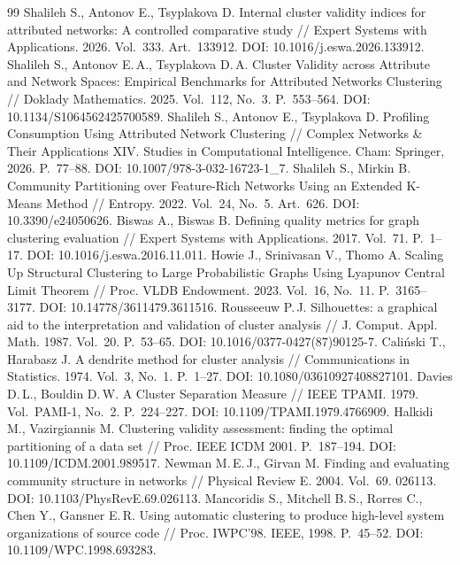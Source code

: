 \documentclass[11pt,a4paper]{article}
\begin{document}
\begin{thebibliography}{99}
\small
{} Shalileh S., Antonov E., Tsyplakova D. Internal cluster validity indices for attributed networks: A controlled comparative study // Expert Systems with Applications. 2026. Vol.~333. Art.~133912. DOI: 10.1016/j.eswa.2026.133912.
 Shalileh S., Antonov E.\,A., Tsyplakova D.\,A. Cluster Validity across Attribute and Network Spaces: Empirical Benchmarks for Attributed Networks Clustering // Doklady Mathematics. 2025. Vol.~112, No.~3. P.~553--564. DOI: 10.1134/S1064562425700589.
 Shalileh S., Antonov E., Tsyplakova D. Profiling Consumption Using Attributed Network Clustering // Complex Networks \& Their Applications XIV. Studies in Computational Intelligence. Cham: Springer, 2026. P.~77--88. DOI: 10.1007/978-3-032-16723-1\_7.
 Shalileh S., Mirkin B. Community Partitioning over Feature-Rich Networks Using an Extended K-Means Method // Entropy. 2022. Vol.~24, No.~5. Art.~626. DOI: 10.3390/e24050626.
 Biswas A., Biswas B. Defining quality metrics for graph clustering evaluation // Expert Systems with Applications. 2017. Vol.~71. P.~1--17. DOI: 10.1016/j.eswa.2016.11.011.
 Howie J., Srinivasan V., Thomo A. Scaling Up Structural Clustering to Large Probabilistic Graphs Using Lyapunov Central Limit Theorem // Proc. VLDB Endowment. 2023. Vol.~16, No.~11. P.~3165--3177. DOI: 10.14778/3611479.3611516.
 Rousseeuw P.\,J. Silhouettes: a graphical aid to the interpretation and validation of cluster analysis // J. Comput. Appl. Math. 1987. Vol.~20. P.~53--65. DOI: 10.1016/0377-0427(87)90125-7.
 Caliński T., Harabasz J. A dendrite method for cluster analysis // Communications in Statistics. 1974. Vol.~3, No.~1. P.~1--27. DOI: 10.1080/03610927408827101.
 Davies D.\,L., Bouldin D.\,W. A Cluster Separation Measure // IEEE TPAMI. 1979. Vol.~PAMI-1, No.~2. P.~224--227. DOI: 10.1109/TPAMI.1979.4766909.
 Halkidi M., Vazirgiannis M. Clustering validity assessment: finding the optimal partitioning of a data set // Proc. IEEE ICDM 2001. P.~187--194. DOI: 10.1109/ICDM.2001.989517.
 Newman M.\,E.\,J., Girvan M. Finding and evaluating community structure in networks // Physical Review E. 2004. Vol.~69. 026113. DOI: 10.1103/PhysRevE.69.026113.
 Mancoridis S., Mitchell B.\,S., Rorres C., Chen Y., Gansner E.\,R. Using automatic clustering to produce high-level system organizations of source code // Proc. IWPC'98. IEEE, 1998. P.~45--52. DOI: 10.1109/WPC.1998.693283.

\end{thebibliography}
\end{document}
